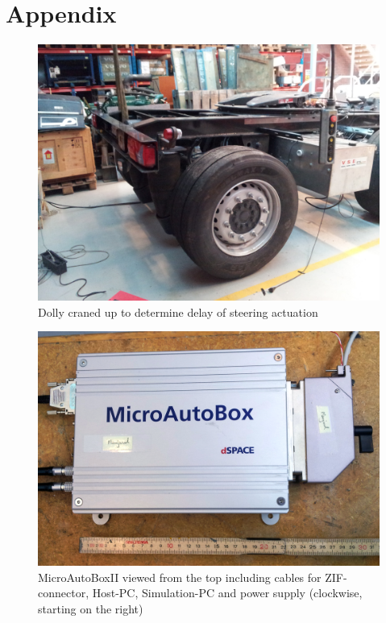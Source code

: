 \documentclass[ExampleMasters.tex]{subfiles}
\begin{document}
\clearpage
\appendix 
{}

\chapter{Appendix}
\label{chap:Appendix}

\begin{figure}[h]
\centering
\includegraphics[width=1\linewidth]{figures/dolly_craned_up}
\caption{Dolly craned up to determine delay of steering actuation}
\label{fig:dolly_craned_up}
\end{figure}

\begin{figure}[h]
	\centering
	\includegraphics[width=1\linewidth]{figures/MABII_topview_cropped}
	\caption{MicroAutoBoxII viewed from the top including cables for ZIF-connector, Host-PC, Simulation-PC and power supply (clockwise, starting on the right)}
	\label{fig:microautobox_topview}
\end{figure}
\end{document}
